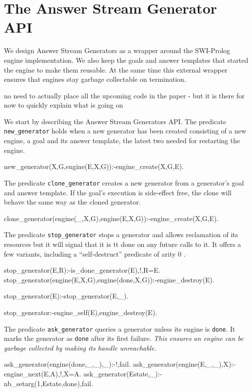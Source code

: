 \documentclass{new_tlp}
\begin{document}
\section{The Answer Stream Generator API}

We design Answer Stream Generators as a wrapper around the SWI-Prolog engine implementation.
We also keep the goals and answer templates that started the engine to make them reusable. At the same time this external wrapper ensures that engines stay garbage collectable on termination.


{\Large no need to actually place all the upcoming code in the paper - but it is there for now to quickly explain what is going on}

We start by describing the Answer Stream Generators API.
The predicate {\tt new\_generator} holds when a new generator has been created
consisting of a new engine, a goal and its answer template, the latest two needed
for restarting the engine.
\begin{code}
new_generator(X,G,engine(E,X,G)):-engine_create(X,G,E).
\end{code}

The predicate  {\tt clone\_generator} creates a new generator from a generator's goal and answer template. If the goal's execution is side-effect free, the clone will behave the same way as the cloned generator.
\begin{code}
clone_generator(engine(_,X,G),engine(E,X,G)):-engine_create(X,G,E).
\end{code}

The predicate {\tt stop\_generator} stops a generator and allows reclamation of its resources but it will signal that it is {tt done} on any future calls to it.
It offers a few variants, including a ``self-destruct'' predicate of arity 0 .
\begin{code}
stop_generator(E,R):-is_done_generator(E),!,R=E.
stop_generator(engine(E,X,G),engine(done,X,G)):-engine_destroy(E).

stop_generator(E):-stop_generator(E,_).

stop_generator:-engine_self(E),engine_destroy(E).
\end{code}

The predicate {\tt ask\_generator} queries a generator unless its engine is {\tt done}.
It marks the generator as {\tt done} after its first failure.
{\em This ensures an engine can be garbage collected by making its handle unreachable.}
\begin{code}  
ask_generator(engine(done,_,_),_):-!,fail.
ask_generator(engine(E,_,_),X):-engine_next(E,A),!,X=A.
ask_generator(Estate,_):-nb_setarg(1,Estate,done),fail.  
\end{code}
\end{document}
